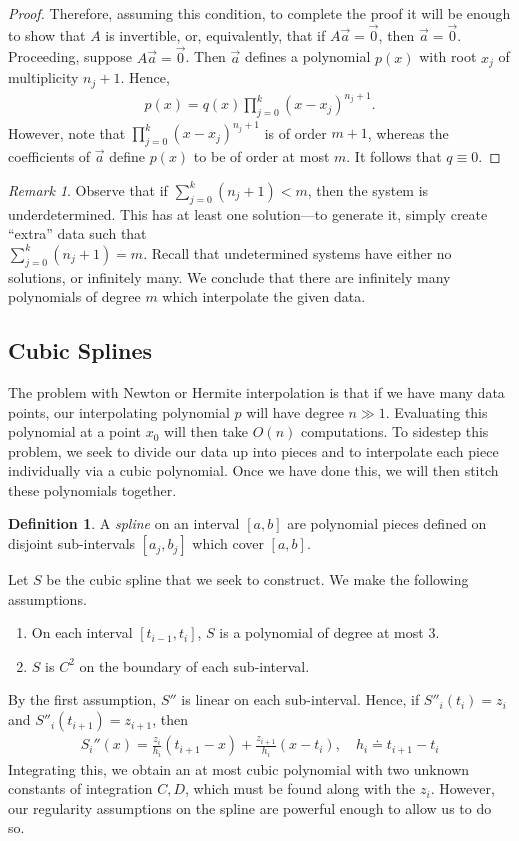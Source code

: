 \documentclass[12pt]{article}
\theoremstyle{plain}
\theoremstyle{definition}
\newtheorem*{definition}{Definition}
\theoremstyle{remark}
\newtheorem*{remark}{Remark}
\numberwithin{equation}{section}  %
\begin{document}
\begin{proof}
Therefore, assuming this condition, to complete
the proof it will be enough to show that $A$ is invertible, or, equivalently,
that if $A \vec{a}=\vec{0}$, then $\vec{a} = \vec{0}$. Proceeding, suppose
$A \vec{a}=\vec{0}$. Then $\vec{a}$ defines a polynomial $p(x)$ with root $x_j$ of
multiplicity $n_j +1$. Hence,
\begin{equation*}
\begin{split}
p(x) = q(x) \prod_{j=0}^{k}(x-x_{j})^{n_{j}+1}.
\end{split}
\end{equation*}
However, note that $\prod_{j=0}^{k}(x-x_{j})^{n_{j}+1}$ is of order $m+1$,
whereas the coefficients of $\vec{a}$ define $p(x)$ to be of order at most $m$.
It follows that $q \equiv 0$. 
\end{proof}
\begin{remark}
Observe that if $\sum_{j=0}^{k}(n_j + 1) < m$, then the system is underdetermined.
This has at least one solution---to generate it, simply create
``extra'' data such that \\ $\sum_{j=0}^k (n_j + 1) = m$. Recall that
undetermined systems have either no solutions, or infinitely many. 
We conclude that there are infinitely many polynomials of degree $m$ which
interpolate the given data.
\end{remark}
\subsection{Cubic Splines}
The problem with Newton or Hermite interpolation is that if we have
many data points, our interpolating polynomial $p$ will have degree $n \gg 1$.
Evaluating this polynomial at a point $x_0$ will then take $O(n)$ computations.
To sidestep this problem, we seek to divide our data up into pieces
and to interpolate each piece individually via a cubic polynomial.
Once we have done this, we will then stitch these polynomials together.
\begin{definition}
A \emph{spline} on an interval $[a,b]$ are polynomial pieces defined on 
disjoint sub-intervals $[a_j,b_j]$ which cover $[a,b]$. 
\end{definition}
Let $S$ be the cubic spline that we seek to construct. We make
the following assumptions.
\begin{enumerate}
\item On each interval $[t_{i-1}, t_i]$, $S$ is a polynomial of degree
at most $3$.
\item $S$ is $C^2$ on the boundary of each sub-interval.
\end{enumerate}
By the first assumption, $S''$ is linear on each sub-interval.
Hence, if $S''_i(t_i) = z_i$ and $S''_{i}(t_{i+1}) = z_{i+1}$,
then
\begin{align*}
S_{i}''(x) = \frac{z_i}{h_i}(t_{i+1} - x) + \frac{z_{i+1}}{h_i}(x- t_i),
\quad h_i \doteq
t_{i+1}- t_i	
\end{align*}
Integrating this, we obtain an at most cubic polynomial with  two unknown
constants of integration $C, D$, which must be found along with the $z_i$.
However, our regularity assumptions on the spline are powerful enough to allow
us to do so.
\end{document}
